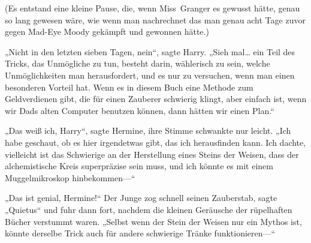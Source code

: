 (Es entstand eine kleine Pause, die, wenn Miss~Granger es gewusst hätte, genau so lang gewesen wäre, wie wenn man nachrechnet das man genau acht Tage zuvor gegen Mad-Eye Moody gekämpft und gewonnen hätte.)

„Nicht in den letzten sieben Tagen, nein“, sagte Harry. „Sieh mal… ein Teil des Tricks, das Unmögliche zu tun, besteht darin, wählerisch zu sein, welche Unmöglichkeiten man herausfordert, und es nur zu versuchen, wenn man einen besonderen Vorteil hat. Wenn es in diesem Buch eine Methode zum Geldverdienen gibt, die für einen Zauberer schwierig klingt, aber einfach ist, wenn wir Dads alten Computer benutzen können, dann hätten wir einen Plan.“

„Das weiß ich, Harry“, sagte Hermine, ihre Stimme schwankte nur leicht. „Ich habe geschaut, ob es hier irgendetwas gibt, das ich herausfinden kann. Ich dachte, vielleicht ist das Schwierige an der Herstellung eines Steins der Weisen, dass der alchemistische Kreis superpräzise sein muss, und ich könnte es mit einem Muggelmikroskop hinbekommen—“

„Das ist genial, Hermine!“ Der Junge zog schnell seinen Zauberstab, sagte „Quietus“ und fuhr dann fort, nachdem die kleinen Geräusche der rüpelhaften Bücher verstummt waren. „Selbst wenn der Stein der Weisen nur ein Mythos ist, könnte derselbe Trick auch für andere schwierige Tränke funktionieren—“

